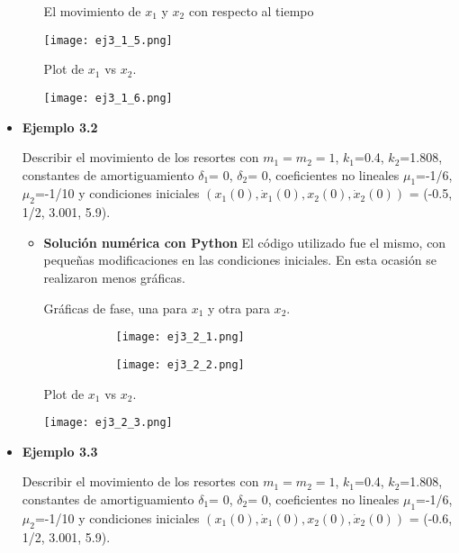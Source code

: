 \documentclass[12pt]{article}
\begin{document}
\begin{itemize}
\begin{itemize}
\clearpage
El movimiento de $x_1$ y $x_2$ con respecto al tiempo

\begin{center}
        \texttt{[image: ej3\_1\_5.png]}
\end{center}

Plot de $x_1$ vs $x_2$.

\begin{center}
        \texttt{[image: ej3\_1\_6.png]}
\end{center}

\end{itemize}

\item \textbf{Ejemplo 3.2}

Describir el movimiento de los resortes con $m_1 = m_2 = 1$, $k_1$=0.4, $k_2$=1.808, constantes de amortiguamiento $\delta _1$= 0, $\delta _2$= 0, coeficientes no lineales $\mu _1$=-1/6, $\mu _2$=-1/10 y condiciones iniciales $(x_1(0), \dot x_1(0), x_2(0), \dot x_2(0))$ = (-0.5, 1/2, 3.001, 5.9).

\begin{itemize}
\item \textbf{Solución numérica con Python}
El código utilizado fue el mismo, con pequeñas modificaciones en las condiciones iniciales. En esta ocasión se realizaron menos gráficas. 

\clearpage
Gráficas de fase, una para $x_1$ y otra para $x_2$.

\begin{figure}[h!]
\begin{subfigure}{.55\textwidth}
\centering
\texttt{[image: ej3\_2\_1.png]}
\end{subfigure}
\begin{subfigure}{.55\textwidth}
\centering
\texttt{[image: ej3\_2\_2.png]}
\end{subfigure}
\end{figure}

Plot de $x_1$ vs $x_2$.
\begin{center}
        \texttt{[image: ej3\_2\_3.png]}
\end{center}

\end{itemize}

\item \textbf{Ejemplo 3.3}

Describir el movimiento de los resortes con $m_1 = m_2 = 1$, $k_1$=0.4, $k_2$=1.808, constantes de amortiguamiento $\delta _1$= 0, $\delta _2$= 0, coeficientes no lineales $\mu _1$=-1/6, $\mu _2$=-1/10 y condiciones iniciales $(x_1(0), \dot x_1(0), x_2(0), \dot x_2(0))$ = (-0.6, 1/2, 3.001, 5.9).


\end{itemize}
\end{document}
